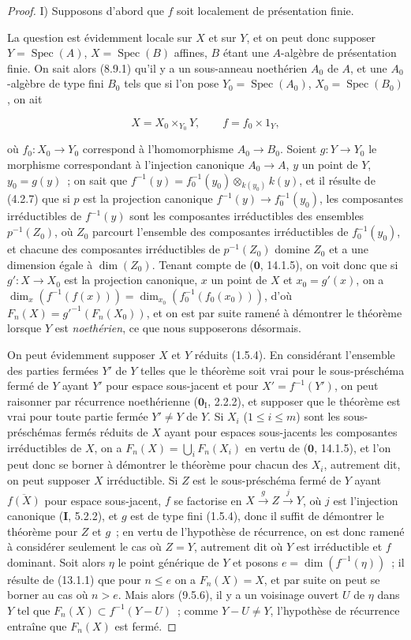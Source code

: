 \begin{proof}
I) Supposons d'abord que $f$ soit localement de présentation finie.

La question est évidemment locale sur $X$ et sur $Y$, et on peut donc supposer
$Y=\operatorname{Spec}(A)$, $X=\operatorname{Spec}(B)$ affines, $B$ étant une
$A$-algèbre de présentation finie. On sait alors (8.9.1) qu'il y a un
sous-anneau noethérien $A_0$ de $A$, et une $A_0$-algèbre de type fini $B_0$
tels que si l'on pose $Y_0=\operatorname{Spec}(A_0)$,
$X_0=\operatorname{Spec}(B_0)$, on ait

\[
  X=X_0\times_{Y_0}Y,\qquad f=f_0\times 1_Y,
\]

où $f_0:X_0\to Y_0$ correspond à l'homomorphisme $A_0\to B_0$. Soient
$g:Y\to Y_0$ le morphisme correspondant à l'injection canonique $A_0\to A$,
$y$ un point de $Y$, $y_0=g(y)$~; on sait que
$f^{-1}(y)=f_0^{-1}(y_0)\otimes_{k(y_0)}k(y)$, et il résulte de (4.2.7) que
si $p$ est la projection canonique $f^{-1}(y)\to f_0^{-1}(y_0)$, les
composantes irréductibles de $f^{-1}(y)$ sont les composantes irréductibles des
ensembles $p^{-1}(Z_0)$, où $Z_0$ parcourt l'ensemble des composantes
irréductibles de $f_0^{-1}(y_0)$, et chacune des composantes irréductibles de
$p^{-1}(Z_0)$ domine $Z_0$ et a une dimension égale à $\dim(Z_0)$. Tenant
compte de ($\mathbf 0$, 14.1.5), on voit donc que si $g':X\to X_0$ est la
projection canonique, $x$ un point de $X$ et $x_0=g'(x)$, on a
$\dim_x(f^{-1}(f(x)))=\dim_{x_0}(f_0^{-1}(f_0(x_0)))$, d'où
$F_n(X)=g'^{-1}(F_n(X_0))$, et on est par suite ramené à démontrer le théorème
lorsque $Y$ est \emph{noethérien}, ce que nous supposerons désormais.

On peut évidemment supposer $X$ et $Y$ réduits (1.5.4). En considérant
l'ensemble des parties fermées $Y'$ de $Y$ telles que le théorème soit vrai
pour le sous-préschéma fermé de $Y$ ayant $Y'$ pour espace sous-jacent et pour
$X'=f^{-1}(Y')$, on peut raisonner par récurrence noethérienne
($\mathbf 0_{\mathrm I}$, 2.2.2), et supposer que le théorème est vrai pour
toute partie fermée $Y'\neq Y$ de $Y$. Si $X_i$ ($1\leq i\leq m$) sont les
sous-préschémas fermés réduits de $X$ ayant pour espaces sous-jacents les
composantes irréductibles de $X$, on a $F_n(X)=\bigcup_iF_n(X_i)$ en vertu de
($\mathbf 0$, 14.1.5), et l'on peut donc se borner à démontrer le théorème pour
chacun des $X_i$, autrement dit, on peut supposer $X$ irréductible. Si $Z$ est
le sous-préschéma fermé de $Y$ ayant $\overline{f(X)}$ pour espace sous-jacent,
$f$ se factorise en $X\xrightarrow{g}Z\xrightarrow{j}Y$, où $j$ est
l'injection canonique (\textbf{I}, 5.2.2), et $g$ est de type fini (1.5.4),
donc il suffit de démontrer le théorème pour $Z$ et $g$~; en vertu de
l'hypothèse de récurrence, on est donc ramené à considérer seulement le cas où
$Z=Y$, autrement dit où $Y$ est irréductible et $f$ dominant. Soit alors
$\eta$ le point générique de $Y$ et posons $e=\dim(f^{-1}(\eta))$~; il résulte
de (13.1.1) que pour $n\leq e$ on a $F_n(X)=X$, et par suite on peut se borner
au cas où $n>e$. Mais alors (9.5.6), il y a un voisinage ouvert $U$ de $\eta$
dans $Y$ tel que $F_n(X)\subset f^{-1}(Y-U)$~; comme $Y-U\neq Y$, l'hypothèse
de récurrence entraîne que $F_n(X)$ est fermé.


\end{proof}
